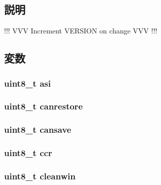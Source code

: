 \subsection{説明}
!!! VVV Increment VERSION on change VVV !!! 

\subsection{変数}
\hypertarget{structSharedData_a04ffaeb169260b645b1d60977a569820}{
\subsubsection[{asi}]{\setlength{\rightskip}{0pt plus 5cm}uint8\_\-t {\bf asi}}}
\label{structSharedData_a04ffaeb169260b645b1d60977a569820}
\hypertarget{structSharedData_ae3b835af923c28d728bce61558318f78}{
\subsubsection[{canrestore}]{\setlength{\rightskip}{0pt plus 5cm}uint8\_\-t {\bf canrestore}}}
\label{structSharedData_ae3b835af923c28d728bce61558318f78}
\hypertarget{structSharedData_a8c2517fd71f35530160c213a888da3d1}{
\subsubsection[{cansave}]{\setlength{\rightskip}{0pt plus 5cm}uint8\_\-t {\bf cansave}}}
\label{structSharedData_a8c2517fd71f35530160c213a888da3d1}
\hypertarget{structSharedData_ac26e6920bbc86ef97a573fcc9b54942f}{
\subsubsection[{ccr}]{\setlength{\rightskip}{0pt plus 5cm}uint8\_\-t {\bf ccr}}}
\label{structSharedData_ac26e6920bbc86ef97a573fcc9b54942f}
\hypertarget{structSharedData_a9b5d1f02751b96c813234ff9106a746c}{
\subsubsection[{cleanwin}]{\setlength{\rightskip}{0pt plus 5cm}uint8\_\-t {\bf cleanwin}}}
